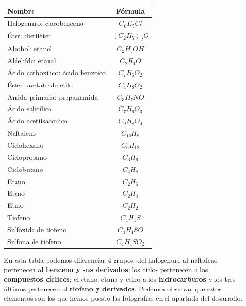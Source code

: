 \begin{table}[H]
\centering
\begin{tabular}{|l|c|}
\hline
\textbf{Nombre}                   & \textbf{Fórmula} \\ \hline
Halogenuro: clorobenceno          &         $C_6H_5Cl$            \\ \hline
Éter: dietiléter                  &         $(C_2H_5)_2O$         \\ \hline
Alcohol: etanol                   &         $C_2H_5OH$         \\ \hline
Aldehído: etanal                  &         $C_2H_4O$         \\ \hline
Ácido carboxílico: ácido benzoico &         $C_7H_6O_2$         \\ \hline
Éster: acetato de etilo           &         $C_4H_8O_2$     \\ \hline
Amida primaria: propanamida       &         $C_3H_7NO$         \\ \hline
Ácido salicílico                  &         $C_7H_6O_3$         \\ \hline
Ácido acetilsalicílico            &         $C_9H_8O_4$         \\ \hline
Naftaleno                         &         $C_{10}H_8$         \\ \hline
Ciclohexano                       &         $C_6H_{12}$         \\ \hline
Ciclopropano                      &         $C_3H_6$         \\ \hline
Ciclobutano                       &         $C_4H_8$         \\ \hline
Etano                             &         $C_2H_6$         \\ \hline
Eteno                             &         $C_2H_4$         \\ \hline
Etino                             &         $C_2H_2$         \\ \hline
Tiofeno                           &         $C_4H_4S$         \\ \hline
Sulfóxido de tiofeno              &         $C_4H_4SO$         \\ \hline
Sulfona de tiofeno                &         $C_4H_4SO_2$         \\ \hline
\end{tabular}
\end{table}

\vspace{0.3cm}

\noindent En esta tabla podemos diferenciar 4 grupos: del halogenuro al naftaleno pertenecen al \textbf{benceno y sus derivados}; los ciclo- pertenecen a los \textbf{compuestos cíclicos}; el etano, etano y etino a los \textbf{hidrocarburos} y los tres últimos pertenecen al \textbf{tiofeno y derivados}. Podemos observar que estos elementos son los que hemos puesto las fotografías en el apartado del desarrollo.








